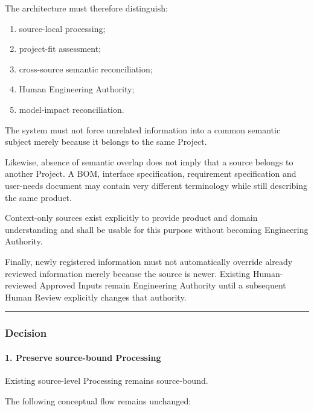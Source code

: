 The architecture must therefore distinguish:

\begin{enumerate}
\def\labelenumi{\arabic{enumi}.}
\tightlist
\item
  source-local processing;
\item
  project-fit assessment;
\item
  cross-source semantic reconciliation;
\item
  Human Engineering Authority;
\item
  model-impact reconciliation.
\end{enumerate}

The system must not force unrelated information into a common semantic subject merely because it belongs to the same Project.

Likewise, absence of semantic overlap does not imply that a source belongs to another Project. A BOM, interface specification, requirement specification and user-needs document may contain very different terminology while still describing the same product.

Context-only sources exist explicitly to provide product and domain understanding and shall be usable for this purpose without becoming Engineering Authority.

Finally, newly registered information must not automatically override already reviewed information merely because the source is newer. Existing Human-reviewed Approved Inputs remain Engineering Authority until a subsequent Human Review explicitly changes that authority.

\begin{center}\rule{0.5\linewidth}{0.5pt}\end{center}

\hypertarget{decision-18}{%
\subsubsection{Decision}\label{decision-18}}

\hypertarget{1-preserve-source-bound-processing}{%
\paragraph{1. Preserve source-bound Processing}\label{1-preserve-source-bound-processing}}

Existing source-level Processing remains source-bound.

The following conceptual flow remains unchanged:

